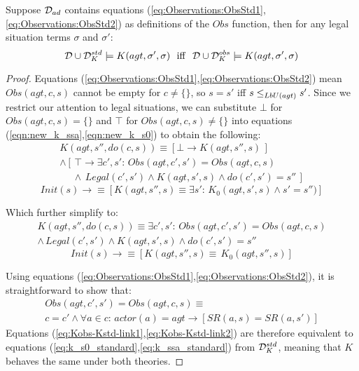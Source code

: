 \begin{thm}
Suppose $\mathcal{D}_{ad}$ contains equations (\ref{eq:Observations:ObsStd1},\ref{eq:Observations:ObsStd2})
as definitions of the $Obs$ function, then for any legal situation
terms $\sigma$ and $\sigma'$:\[
\mathcal{D}\cup\mathcal{D}_{K}^{std}\models K(agt,\sigma',\sigma)\,\,\,\,\mathrm{iff}\,\,\,\,\mathcal{D}\cup\mathcal{D}_{K}^{obs}\models K(agt,\sigma',\sigma)\]

\end{thm}
\begin{proof}
Equations (\ref{eq:Observations:ObsStd1},\ref{eq:Observations:ObsStd2})
mean $Obs(agt,c,s)$ cannot be empty for $c\neq\{\}$, so $s=s'$
iff $s\leq_{LbU(agt)}s'$. Since we restrict our attention to legal
situations, we can substitute $\bot$ for $Obs(agt,c,s)=\{\}$ and
$\top$ for $Obs(agt,c,s)\neq\{\}$ into equations (\ref{eqn:new_k_ssa},\ref{eqn:new_k_s0})
to obtain the following:\begin{multline*}
K(agt,s'',do(c,s))\equiv\left[\bot\rightarrow K(agt,s'',s)\,\right]\\
\wedge\left[\,\top\rightarrow\exists c',s':\, Obs(agt,c',s')=Obs(agt,c,s)\right.\\
\left.\,\,\,\,\,\,\,\,\wedge\, Legal(c',s')\wedge K(agt,s',s)\wedge do(c',s')=s''\,\right]\end{multline*}
 \[
Init(s)\rightarrow\equiv\left[K(agt,s'',s)\equiv\exists s':\, K_{0}(agt,s',s)\wedge s'=s'')\right]\]


Which further simplify to:\begin{multline}
K(agt,s'',do(c,s))\equiv\exists c',s':\, Obs(agt,c',s')=Obs(agt,c,s)\\
\wedge\, Legal(c',s')\wedge K(agt,s',s)\wedge do(c',s')=s''\label{eq:Kobs-Kstd-link1}\end{multline}
 \begin{equation}
Init(s)\rightarrow\equiv\left[K(agt,s'',s)\equiv\, K_{0}(agt,s'',s)\right]\label{eq:Kobs-Kstd-link2}\end{equation}


Using equations (\ref{eq:Observations:ObsStd1},\ref{eq:Observations:ObsStd2}),
it is straightforward to show that:\begin{multline*}
Obs(agt,c',s')=Obs(agt,c,s)\equiv\\
c=c'\wedge\forall a\in c:\, actor(a)=agt\rightarrow\left[SR(a,s)=SR(a,s')\right]\end{multline*}
 Equations (\ref{eq:Kobs-Kstd-link1},\ref{eq:Kobs-Kstd-link2}) are
therefore equivalent to equations (\ref{eq:k_s0_standard},\ref{eq:k_ssa_standard})
from $\mathcal{D}_{K}^{std}$, meaning that $K$ behaves the same under both
theories. 
\end{proof}
